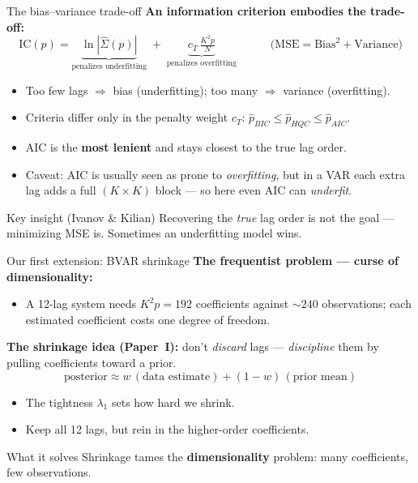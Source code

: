 \documentclass[aspectratio=169]{beamer}
\begin{document}
\begin{frame}{The bias--variance trade-off}
  \textbf{An information criterion embodies the trade-off:}
  \[
    \mathrm{IC}(p) =
    \underbrace{\ln|\hat\Sigma(p)|}_{\text{penalizes underfitting}}
    \; + \;
    \underbrace{c_T\,\tfrac{K^2 p}{N}}_{\text{penalizes overfitting}}
    \qquad\quad
    \bigl(\text{MSE} = \text{Bias}^2 + \text{Variance}\bigr)
  \]
  \begin{itemize}
    \item Too few lags $\Rightarrow$ bias (underfitting); too many $\Rightarrow$ variance (overfitting).
    \item Criteria differ only in the penalty weight $c_T$:
          $\hat p_{BIC} \le \hat p_{HQC} \le \hat p_{AIC}$.
    \item AIC is the \textbf{most lenient} and stays closest to the true lag order.
    \item Caveat: AIC is usually seen as prone to \emph{overfitting}, but in a VAR each
          extra lag adds a full $(K\times K)$ block --- so here even AIC can \emph{underfit}.
  \end{itemize}
  \begin{block}{Key insight (Ivanov \& Kilian)}
    Recovering the \emph{true} lag order is not the goal --- minimizing MSE is.
    Sometimes an underfitting model wins.
  \end{block}
\end{frame}

\begin{frame}{Our first extension: BVAR shrinkage}
  \textbf{The frequentist problem --- curse of dimensionality:}
  \begin{itemize}
    \item A 12-lag system needs $K^2 p = 192$ coefficients against $\sim\!240$ observations;
          each estimated coefficient costs one degree of freedom.
  \end{itemize}
  \textbf{The shrinkage idea (Paper~I):} don't \emph{discard} lags --- \emph{discipline} them
  by pulling coefficients toward a prior.
  \[
    \text{posterior} \approx w\,(\text{data estimate}) + (1-w)\,(\text{prior mean})
  \]
  \begin{itemize}
    \item The tightness $\lambda_1$ sets how hard we shrink.
    \item Keep all 12 lags, but rein in the higher-order coefficients.
  \end{itemize}
  \begin{block}{What it solves}
    Shrinkage tames the \textbf{dimensionality} problem: many coefficients, few observations.
  \end{block}
\end{frame}
\end{document}
